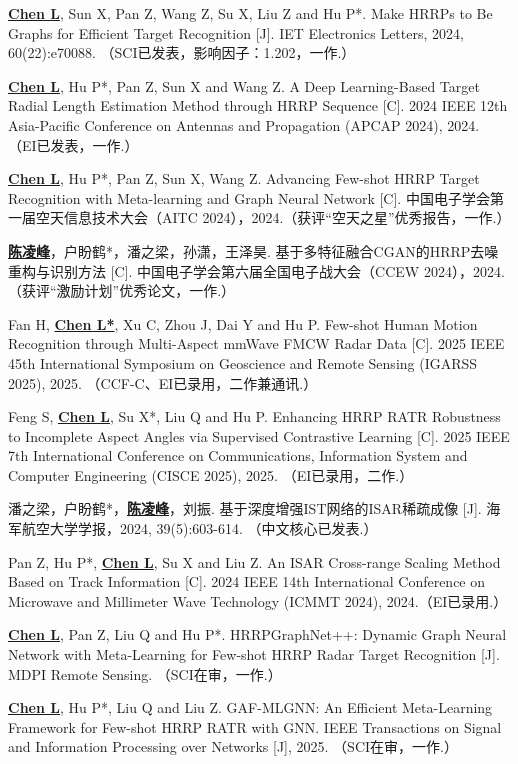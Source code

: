 \begin{resume}
\begin{enumerate}[label={[\arabic*]},itemsep=0pt,parsep=0pt,labelindent=26pt,labelwidth=*,leftmargin=0pt,itemindent=*,align=left]
  \item \textbf{\underline{Chen L}}, Sun X, Pan Z, Wang Z, Su X, Liu Z and Hu P*. Make HRRPs to Be Graphs for Efficient Target Recognition [J]. IET Electronics Letters, 2024, 60(22):e70088. （SCI已发表，影响因子：1.202，一作.）
  \item \textbf{\underline{Chen L}}, Hu P*, Pan Z, Sun X and Wang Z. A Deep Learning-Based Target Radial Length Estimation Method through HRRP Sequence [C]. 2024 IEEE 12th Asia-Pacific Conference on Antennas and Propagation (APCAP 2024), 2024. （EI已发表，一作.）
  \item \textbf{\underline{Chen L}}, Hu P*, Pan Z, Sun X, Wang Z. Advancing Few-shot HRRP Target Recognition with Meta-learning and Graph Neural Network [C]. 中国电子学会第一届空天信息技术大会（AITC 2024），2024.（获评“空天之星”优秀报告，一作.）
  \item \textbf{\underline{陈凌峰}}，{户盼鹤*}，潘之梁，孙潇，王泽昊. 基于多特征融合CGAN的HRRP去噪重构与识别方法 [C]. 中国电子学会第六届全国电子战大会（CCEW 2024），2024.（获评“激励计划”优秀论文，一作.）
  \item Fan H, \textbf{\underline{Chen L*}}, Xu C, Zhou J, Dai Y and Hu P. Few-shot Human Motion Recognition through Multi-Aspect mmWave FMCW Radar Data [C]. 2025 IEEE 45th International Symposium on Geoscience and Remote Sensing (IGARSS 2025), 2025. （CCF-C、EI已录用，二作兼通讯.）
  \item Feng S, \textbf{\underline{Chen L}}, Su X*, Liu Q and Hu P. Enhancing HRRP RATR Robustness to Incomplete Aspect Angles via Supervised Contrastive Learning [C]. 2025 IEEE 7th International Conference on Communications, Information System and Computer Engineering (CISCE 2025), 2025. （EI已录用，二作.）
  \item 潘之梁，户盼鹤*，\textbf{\underline{陈凌峰}}，刘振. 基于深度增强IST网络的ISAR稀疏成像 [J]. 海军航空大学学报，2024, 39(5):603-614. （中文核心已发表.）
  \item Pan Z, Hu P*, \textbf{\underline{Chen L}}, Su X and Liu Z. An ISAR Cross-range Scaling Method Based on Track Information [C]. 2024 IEEE 14th International Conference on Microwave and Millimeter Wave Technology (ICMMT 2024), 2024.（EI已录用.）
  \item \textbf{\underline{Chen L}}, Pan Z, Liu Q and Hu P*. HRRPGraphNet++: Dynamic Graph Neural Network with Meta-Learning for Few-shot HRRP Radar Target Recognition [J]. MDPI Remote Sensing. （SCI在审，一作.）
  \item \textbf{\underline{Chen L}}, Hu P*, Liu Q and Liu Z. GAF-MLGNN: An Efficient Meta-Learning Framework for Few-shot HRRP RATR with GNN. IEEE Transactions on Signal and Information Processing over Networks [J], 2025. （SCI在审，一作.）

\end{enumerate}
\end{resume}
